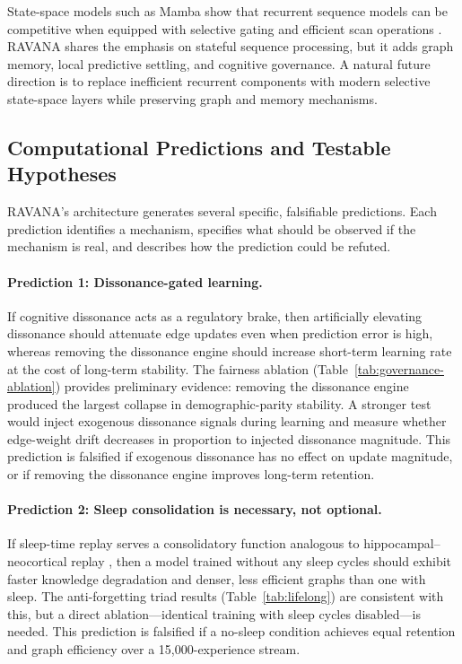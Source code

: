 \documentclass[11pt]{article}
\begin{document}
State-space models such as Mamba show that recurrent sequence models can be competitive when equipped with selective gating and efficient scan operations \cite{gu2023}. RAVANA shares the emphasis on stateful sequence processing, but it adds graph memory, local predictive settling, and cognitive governance. A natural future direction is to replace inefficient recurrent components with modern selective state-space layers while preserving graph and memory mechanisms.

\subsection{Computational Predictions and Testable Hypotheses}
RAVANA's architecture generates several specific, falsifiable predictions. Each prediction identifies a mechanism, specifies what should be observed if the mechanism is real, and describes how the prediction could be refuted.

\paragraph{Prediction 1: Dissonance-gated learning.}
If cognitive dissonance acts as a regulatory brake, then artificially elevating dissonance should attenuate edge updates even when prediction error is high, whereas removing the dissonance engine should increase short-term learning rate at the cost of long-term stability. The fairness ablation (Table~\ref{tab:governance-ablation}) provides preliminary evidence: removing the dissonance engine produced the largest collapse in demographic-parity stability. A stronger test would inject exogenous dissonance signals during learning and measure whether edge-weight drift decreases in proportion to injected dissonance magnitude. This prediction is falsified if exogenous dissonance has no effect on update magnitude, or if removing the dissonance engine improves long-term retention.

\paragraph{Prediction 2: Sleep consolidation is necessary, not optional.}
If sleep-time replay serves a consolidatory function analogous to hippocampal--neocortical replay \cite{wilson1994,ji2007}, then a model trained without any sleep cycles should exhibit faster knowledge degradation and denser, less efficient graphs than one with sleep. The anti-forgetting triad results (Table~\ref{tab:lifelong}) are consistent with this, but a direct ablation---identical training with sleep cycles disabled---is needed. This prediction is falsified if a no-sleep condition achieves equal retention and graph efficiency over a 15,000-experience stream.
\end{document}
